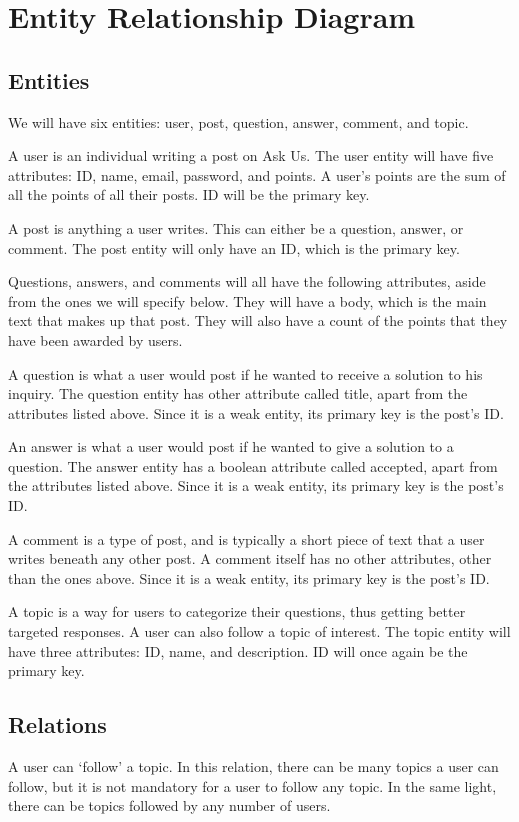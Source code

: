 \section{Entity Relationship Diagram}
\subsection{Entities}
We will have six entities: user, post, question, answer, comment, and topic.

A user is an individual writing a post on Ask Us. The user entity will have five attributes: ID, name, email, password, and points. A user's points are the sum of all the points of all their posts. ID will be the primary key.

A post is anything a user writes. This can either be a question, answer, or comment. The post entity will only have an ID, which is the primary key.

Questions, answers, and comments will all have the following attributes, aside from the ones we will specify below. They will have a body, which is the main text that makes up that post. They will also have a count of the points that they have been awarded by users.

A question is what a user would post if he wanted to receive a solution to his inquiry. The question entity has other attribute called title, apart from the attributes listed above. Since it is a weak entity, its primary key is the post's ID.

An answer is what a user would post if he wanted to give a solution to a question. The answer entity has a boolean attribute called accepted, apart from the attributes listed above. Since it is a weak entity, its primary key is the post's ID.

A comment is a type of post, and is typically a short piece of text that a user writes beneath any other post. A comment itself has no other attributes, other than the ones above. Since it is a weak entity, its primary key is the post's ID.

A topic is a way for users to categorize their questions, thus getting better targeted responses. A user can also follow a topic of interest. The topic entity will have three attributes: ID, name, and description. ID will once again be the primary key.

\subsection{Relations}
A user can `follow' a topic. In this relation, there can be many topics a user can follow, but it is not mandatory for a user to follow any topic. In the same light, there can be topics followed by any number of users.

